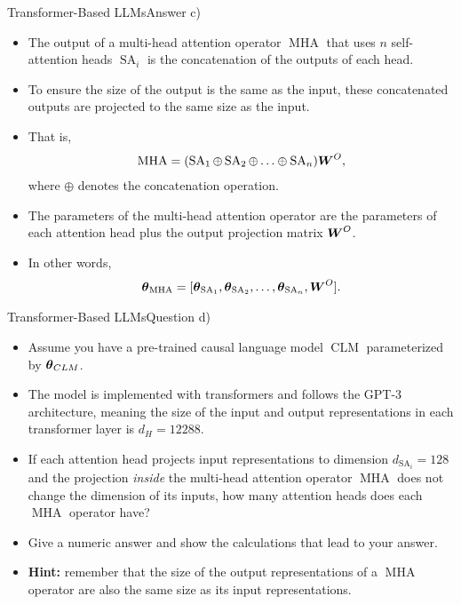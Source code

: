 \documentclass[t]{beamer}
\newcommand\op[1]{\operatorname{#1}}
\begin{document}
\begin{frame}{Transformer-Based LLMs}{Answer c)}
    \begin{itemize}
        \item The output of a multi-head attention operator $\op{MHA}$ that uses
              $n$ self-attention heads $\op{SA}_i$ is the concatenation of the
              outputs of each head.
        \item To ensure the size of the output is the same as the input, these
              concatenated outputs are projected to the same size as the input.
        \item That is,
              \begin{align}\label{eq:mha}
                  \op{MHA} = (\op{SA}_1 \oplus \op{SA}_2 \oplus \ldots \oplus \op{SA}_n)\mW^O,
              \end{align}
              where $\oplus$ denotes the concatenation operation.
        \item The parameters of the multi-head attention operator are the
              parameters of each attention head plus the output projection
              matrix ${\boldsymbol{W}}^O$.
        \item In other words,
              \begin{align}
                  \vtheta_{\op{MHA}} = [\vtheta_{\op{SA}_1}, \vtheta_{\op{SA}_2}, \ldots, \vtheta_{\op{SA}_n}, \mW^O].
              \end{align}
    \end{itemize}
\end{frame}

\begin{frame}{Transformer-Based LLMs}{Question d)}
    \begin{itemize}
        \item Assume you have a pre-trained causal language model $\op{CLM}$
              parameterized by ${\boldsymbol{\theta}}_{CLM}$.
        \item The model is implemented with transformers and follows the GPT-3
              architecture, meaning the size of the input and output
              representations in each transformer layer is $d_H = 12288$.
        \item If each attention head projects input representations to dimension
              $d_{\op{SA}_i} = 128$ and the projection \emph{inside} the
              multi-head attention operator $\op{MHA}$ does not change the
              dimension of its inputs, how many attention heads does each
              $\op{MHA}$ operator have?
        \item Give a numeric answer and show the calculations that lead to your
              answer.
        \item \textbf{Hint:} remember that the size of the output
              representations of a $\op{MHA}$ operator are also the same size as
              its input representations.
    \end{itemize}
\end{frame}
\end{document}
